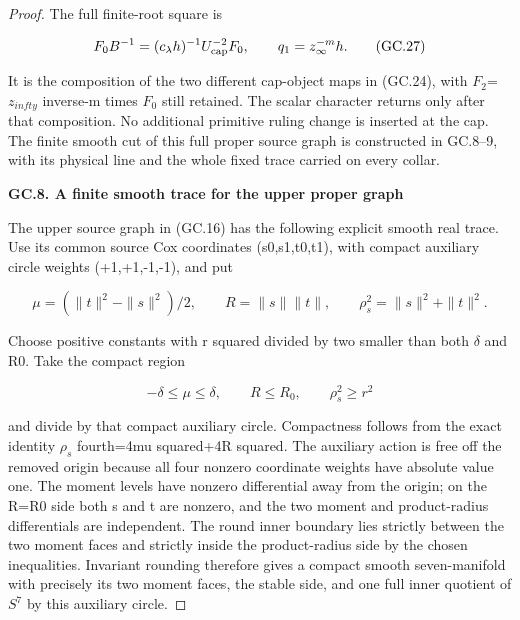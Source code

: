 \begin{proof}
The full finite-root square is

\[
 F_0B^{-1}=(c_\lambda h)^{-1}U_{\rm cap}^{-2}F_0,
                    \qquad q_1=z_\infty^{-m}h.
 \tag{GC.27}
\]

It is the composition of the two different cap-object maps
in (GC.24), with \(F_2\)=\(z_{infty}\) inverse-m times \(F_0\) still retained.
The scalar character returns only after that composition.
No additional primitive ruling change is inserted at the cap.
The finite smooth cut of this full proper source graph is
constructed in GC.8--9, with its physical line and the whole
fixed trace carried on every collar.

\par

\medskip\noindent\textbf{GC.8. A finite smooth trace for the upper proper graph}

\par\nobreak

The upper source graph in (GC.16) has the following explicit
smooth real trace. Use its common source Cox coordinates
(s0,s1,t0,t1), with compact auxiliary circle weights
(+1,+1,-1,-1), and put

\[
 \mu=(\|t\|^2-\|s\|^2)/2,\qquad R=\|s\|\|t\|,
                  \qquad \rho_s^2=\|s\|^2+\|t\|^2.
 \tag{GC.28}
\]

Choose positive constants with r squared divided by two smaller
than both \(\delta\) and R0. Take the compact region

\[
 -\delta\le\mu\le\delta,\qquad R\le R_0,
                         \qquad \rho_s^2\ge r^2
 \tag{GC.29}
\]

and divide by that compact auxiliary circle. Compactness follows
from the exact identity \(\rho_{s}\) fourth=4mu squared+4R squared.
The auxiliary action is free off the removed origin because all
four nonzero coordinate weights have absolute value one. The
moment levels have nonzero differential away from the origin;
on the R=R0 side both s and t are nonzero, and the two moment
and product-radius differentials are independent. The round
inner boundary lies strictly between the two moment faces and
strictly inside the product-radius side by the chosen inequalities.
Invariant rounding therefore gives a compact smooth seven-manifold
with precisely its two moment faces, the stable side, and one
full inner quotient of \(S^7\) by this auxiliary circle.


\end{proof}
